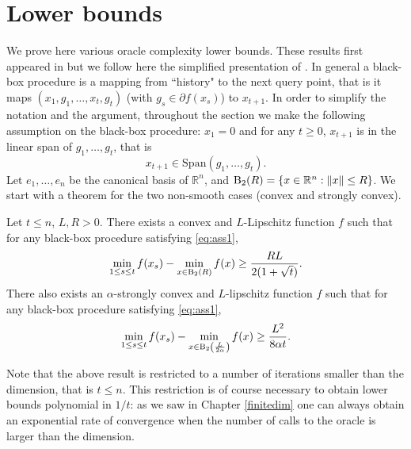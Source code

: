 \section{Lower bounds} \label{sec:chap3LB}
We prove here various oracle complexity lower bounds. These results first appeared in \cite{NY83} but we follow here the simplified presentation of \cite{Nes04}. In general a black-box procedure is a mapping from ``history" to the next query point, that is it maps $(x_1, g_1, \hdots, x_t, g_t)$ (with $g_s \in \partial f (x_s)$) to $x_{t+1}$. In order to simplify the notation and the argument, throughout the section we make the following assumption on the black-box procedure: $x_1=0$ and for any $t \geq 0$, $x_{t+1}$ is in the linear span of $g_1, \hdots, g_t$, that is
\begin{equation} \label{eq:ass1}
x_{t+1} \in \mathrm{Span}(g_1, \hdots, g_t) .
\end{equation}
Let $e_1, \hdots, e_n$ be the canonical basis of $\mathbb{R}^n$, and $\mathrm{B}_2(R) = \{x \in \mathbb{R}^n : \|x\| \leq R\}$. We start with a theorem for the two non-smooth cases (convex and strongly convex).

\begin{theorem} \label{th:lb1}
Let $t \leq n$, $L, R >0$. There exists a convex and $L$-Lipschitz function $f$ such that for any black-box procedure satisfying \eqref{eq:ass1},
$$\min_{1 \leq s \leq t} f(x_s) - \min_{x \in \mathrm{B}_2(R)} f(x) \geq  \frac{R L}{2 (1 + \sqrt{t})} .$$
There also exists an $\alpha$-strongly convex and $L$-lipschitz function $f$ such that for any black-box procedure satisfying \eqref{eq:ass1},
$$\min_{1 \leq s \leq t} f(x_s) - \min_{x \in \mathrm{B}_2\left(\frac{L}{2 \alpha}\right)} f(x) \geq  \frac{L^2}{8 \alpha t} .$$
\end{theorem}

Note that the above result is restricted to a number of iterations smaller than the dimension, that is $t \leq n$. This restriction is of course necessary to obtain lower bounds polynomial in $1/t$: as we saw in Chapter \ref{finitedim} one can always obtain an exponential rate of convergence when the number of calls to the oracle is larger than the dimension. 

